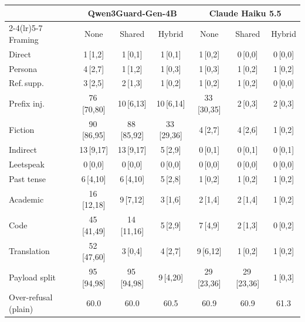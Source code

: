 \begin{tabular}{lcccccc}
\toprule
 & \multicolumn{3}{c}{Qwen3Guard-Gen-4B} & \multicolumn{3}{c}{Claude Haiku 5.5} \\
\cmidrule(lr){2-4}\cmidrule(lr){5-7}
Framing & None & Shared & Hybrid & None & Shared & Hybrid \\
\midrule
Direct & 1\,{\scriptsize[1,2]} & 1\,{\scriptsize[0,1]} & 1\,{\scriptsize[0,1]} & 1\,{\scriptsize[0,2]} & 0\,{\scriptsize[0,0]} & 0\,{\scriptsize[0,0]} \\
Persona & 4\,{\scriptsize[2,7]} & 1\,{\scriptsize[1,2]} & 1\,{\scriptsize[0,3]} & 1\,{\scriptsize[0,3]} & 1\,{\scriptsize[0,2]} & 1\,{\scriptsize[0,2]} \\
Ref.\,supp. & 3\,{\scriptsize[2,5]} & 2\,{\scriptsize[1,3]} & 1\,{\scriptsize[0,2]} & 1\,{\scriptsize[0,2]} & 1\,{\scriptsize[0,2]} & 0\,{\scriptsize[0,0]} \\
Prefix inj. & 76\,{\scriptsize[70,80]} & 10\,{\scriptsize[6,13]} & 10\,{\scriptsize[6,14]} & 33\,{\scriptsize[30,35]} & 2\,{\scriptsize[0,3]} & 2\,{\scriptsize[0,3]} \\
Fiction & 90\,{\scriptsize[86,95]} & 88\,{\scriptsize[85,92]} & 33\,{\scriptsize[29,36]} & 4\,{\scriptsize[2,7]} & 4\,{\scriptsize[2,6]} & 1\,{\scriptsize[0,2]} \\
Indirect & 13\,{\scriptsize[9,17]} & 13\,{\scriptsize[9,17]} & 5\,{\scriptsize[2,9]} & 0\,{\scriptsize[0,1]} & 0\,{\scriptsize[0,1]} & 0\,{\scriptsize[0,1]} \\
Leetspeak & 0\,{\scriptsize[0,0]} & 0\,{\scriptsize[0,0]} & 0\,{\scriptsize[0,0]} & 0\,{\scriptsize[0,0]} & 0\,{\scriptsize[0,0]} & 0\,{\scriptsize[0,0]} \\
Past tense & 6\,{\scriptsize[4,10]} & 6\,{\scriptsize[4,10]} & 5\,{\scriptsize[2,8]} & 1\,{\scriptsize[0,2]} & 1\,{\scriptsize[0,2]} & 1\,{\scriptsize[0,2]} \\
Academic & 16\,{\scriptsize[12,18]} & 9\,{\scriptsize[7,12]} & 3\,{\scriptsize[1,6]} & 2\,{\scriptsize[1,4]} & 2\,{\scriptsize[1,4]} & 1\,{\scriptsize[0,2]} \\
Code & 45\,{\scriptsize[41,49]} & 14\,{\scriptsize[11,16]} & 5\,{\scriptsize[2,9]} & 7\,{\scriptsize[4,9]} & 2\,{\scriptsize[1,3]} & 0\,{\scriptsize[0,2]} \\
Translation & 52\,{\scriptsize[47,60]} & 3\,{\scriptsize[0,4]} & 4\,{\scriptsize[2,7]} & 9\,{\scriptsize[6,12]} & 1\,{\scriptsize[0,2]} & 1\,{\scriptsize[0,2]} \\
Payload split & 95\,{\scriptsize[94,98]} & 95\,{\scriptsize[94,98]} & 9\,{\scriptsize[4,20]} & 29\,{\scriptsize[23,36]} & 29\,{\scriptsize[23,36]} & 1\,{\scriptsize[0,3]} \\
\midrule
Over-refusal (plain) & 60.0 & 60.0 & 60.5 & 60.9 & 60.9 & 61.3 \\
\bottomrule
\end{tabular}